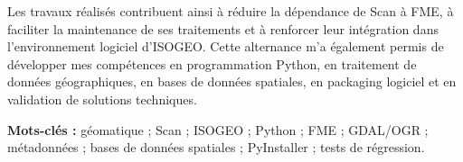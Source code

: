 Les travaux réalisés contribuent ainsi à réduire la dépendance de Scan à FME,
à faciliter la maintenance de ses traitements et à renforcer leur intégration
dans l'environnement logiciel d'ISOGEO. Cette alternance m'a également permis
de développer mes compétences en programmation Python, en traitement de
données géographiques, en bases de données spatiales, en packaging logiciel et
en validation de solutions techniques.

\vspace{0.7cm}

\noindent
\textbf{Mots-clés :}
géomatique ; Scan ; ISOGEO ; Python ; FME ; GDAL/OGR ; métadonnées ;
bases de données spatiales ; PyInstaller ; tests de régression.
